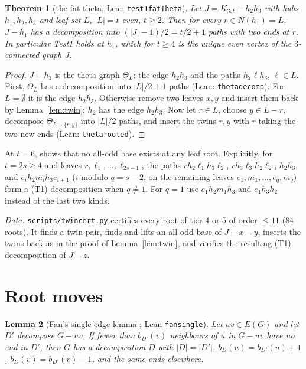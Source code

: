 \documentclass[11pt]{amsart}
\newtheorem{theorem}{Theorem}[section]
\newtheorem{lemma}[theorem]{Lemma}
\theoremstyle{definition}
\theoremstyle{remark}
\renewcommand{\_}{\oldunderscore\allowbreak}
\newcommand{\lean}[1]{\textup{(Lean: {\small\texttt{#1}})}}
\begin{document}
\begin{theorem}[the fat theta; Lean \texttt{test1\_fatTheta}]\label{thm:fat}
Let $J=K_{3,t}+h_2h_3$ with hubs $h_1,h_2,h_3$ and leaf set $L$, $|L|=t$ even, $t\ge2$. Then for
every $r\in N(h_1)=L$, $J-h_1$ has a decomposition into $(|J|-1)/2=t/2+1$ paths with two ends at
$r$. In particular Test1 holds at $h_1$, which for $t\ge4$ is the unique even vertex of the
$3$-connected graph $J$.
\end{theorem}

\begin{proof}
$J-h_1$ is the theta graph $\Theta_L$: the edge $h_2h_3$ and the paths $h_2\ell h_3$, $\ell\in L$.
First, $\Theta_L$ has a decomposition into $|L|/2+1$ paths \lean{theta\_decomp}. For $L=\emptyset$
it is the edge $h_2h_3$. Otherwise remove two leaves $x,y$ and insert them back by
Lemma~\ref{lem:twin}; $h_2$ has the edge $h_2h_3$. Now let $r\in L$, choose $y\in L-r$,
decompose $\Theta_{L-\{r,y\}}$ into $|L|/2$ paths, and insert the twins $r,y$ with $r$ taking the two
new ends \lean{theta\_rooted}.
\end{proof}

At $t=6$, \cite[Example~7.3]{T2} shows that no all-odd base exists at any leaf root. Explicitly,
for $t=2s\ge4$ and leaves $r,\ell_1,\dots,\ell_{2s-1}$, the paths
$r h_2\ell_1h_3\ell_2$, $rh_3\ell_3h_2\ell_2$, $h_2h_3$, and
$e_ih_2m_ih_3e_{i+1}$ ($i$ modulo $q=s-2$, on the remaining leaves $e_1,m_1,\dots,e_q,m_q$) form a
(T1) decomposition when $q\ne1$. For $q=1$ use $e_1h_2m_1h_3$ and $e_1h_3h_2$ instead of the last
two kinds.

\emph{Data.} \texttt{scripts/twin\_cert.py} certifies every root of tier $4$ or $5$ of order
$\le11$ ($84$ roots). It finds a twin pair, finds and lifts an all-odd base of $J-x-y$, inserts the
twins back as in the proof of Lemma~\ref{lem:twin}, and verifies the resulting (T1) decomposition
of $J-z$.

\section{Root moves}\label{sec:moves}

\begin{lemma}[Fan's single-edge lemma {\cite{Fan05}}; Lean \texttt{fan\_single}]\label{lem:fan}
Let $uv\in E(G)$ and let $D'$ decompose $G-uv$. If fewer than $b_{D'}(v)$ neighbours of $u$ in
$G-uv$ have no end in $D'$, then $G$ has a decomposition $D$ with $|D|=|D'|$,
$b_D(u)=b_{D'}(u)+1$, $b_D(v)=b_{D'}(v)-1$, and the same ends elsewhere.
\end{lemma}
\end{document}
